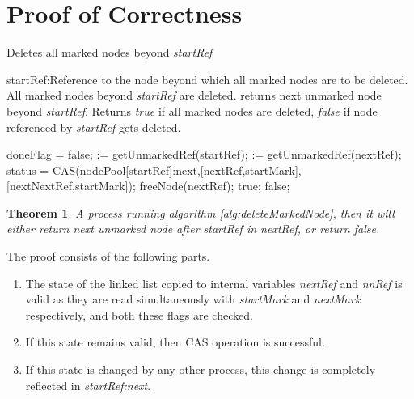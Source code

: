 \documentclass[11pt,onecolumn]{IEEEtran}
\newtheorem {theorem}{Theorem}
\begin{document}
\section{Proof of Correctness}
\begin{algorithm}
  \caption{Deletes all marked nodes beyond {\it startRef}}
  \label{alg:deleteMarkedNode}
  
  \begin{algorithmic}[1]
    \Require
       \Statex startRef:Reference to the node beyond which all
               marked nodes are to be deleted. 
    \Ensure
       \Statex All marked nodes beyond {\it startRef} are deleted.
        returns next unmarked node beyond {\it startRef}.  
       \Statex Returns {\it true} if all marked nodes are deleted,
               {\it false} if node referenced by {\it startRef} gets deleted.  

    \Statex   
      \State doneFlag = false;
         := getUnmarkedRef(startRef);
           := getUnmarkedRef(nextRef);
            \State status = CAS(nodePool[startRef]:next,[nextRef,startMark],[nextNextRef,startMark]);
               \State freeNode(nextRef);
            \EndIf
          \Else
            \State
            \Return true;
          \EndIf
        \Else{}
          \State
          \Return false;  
        \EndIf
      \EndWhile        
    \EndFunction
  \end{algorithmic}
\end{algorithm}

\begin{theorem}
  A process running algorithm \ref{alg:deleteMarkedNode}, then it will either return next unmarked node after {\it startRef} in {\it nextRef}, or return {\it false}.
\end{theorem}
\begin{IEEEproof}
  The proof consists of the following parts.
  \begin{enumerate}
    \item The state of the linked list copied to internal variables {\it nextRef} and {\it nnRef} is valid as they are read simultaneously with {\it startMark} and {\it nextMark} respectively, and both these flags are checked.
    \item If this state remains valid, then CAS operation is successful.
    \item If this state is changed by any other process, this change is completely reflected in {\it startRef:next}.  
\end{enumerate} 
\end{IEEEproof}
\end{document}
